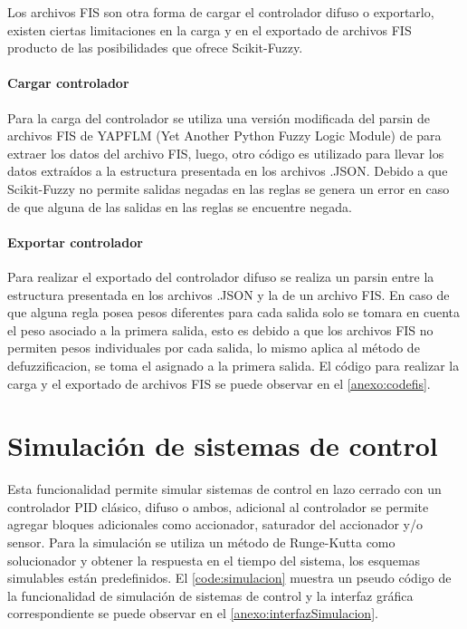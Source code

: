             Los archivos FIS son otra forma de cargar el controlador difuso o exportarlo, existen ciertas limitaciones en la carga y en el exportado de archivos FIS producto de las posibilidades que ofrece Scikit-Fuzzy.    

            \paragraph{Cargar controlador}
            
                 Para la carga del controlador se utiliza una versión modificada del parsin de archivos FIS de YAPFLM (Yet Another Python Fuzzy Logic Module) de \textcite{sputnick1124} para extraer los datos del archivo FIS, luego, otro código es utilizado para llevar los datos extraídos a la estructura presentada en los archivos .JSON. Debido a que Scikit-Fuzzy no permite salidas negadas en las reglas se genera un error en caso de que alguna de las salidas en las reglas se encuentre negada.
            
            \paragraph{Exportar controlador}

                Para realizar el exportado del controlador difuso se realiza un parsin entre la estructura presentada en los archivos .JSON y la de un archivo FIS. En caso de que alguna regla posea pesos diferentes para cada salida solo se tomara en cuenta el peso asociado a la primera salida, esto es debido a que los archivos FIS no permiten pesos individuales por cada salida, lo mismo aplica al método de defuzzificacion, se toma el asignado a la primera salida. El código para realizar la carga y el exportado de archivos FIS se puede observar en el \ref{anexo:codefis}.

\section{Simulación de sistemas de control}

    Esta funcionalidad permite simular sistemas de control en lazo cerrado con un controlador PID clásico, difuso o ambos, adicional al controlador se permite agregar bloques adicionales como accionador, saturador del accionador y/o sensor. Para la simulación se utiliza un método de Runge-Kutta como solucionador y obtener la respuesta en el tiempo del sistema, los esquemas simulables están predefinidos. El \cref{code:simulacion} muestra un pseudo código de la funcionalidad de simulación de sistemas de control y la interfaz gráfica correspondiente se puede observar en el \ref{anexo:interfazSimulacion}.

